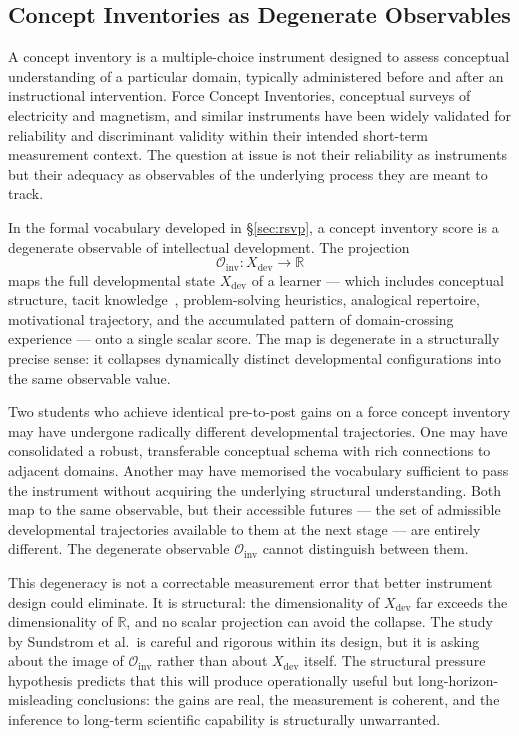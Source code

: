 \documentclass[11pt,a4paper]{article}
\theoremstyle{plain}
\theoremstyle{definition}
\theoremstyle{remark}
\begin{document}
\subsection{Concept Inventories as Degenerate Observables}

A concept inventory is a multiple-choice instrument designed to assess
conceptual understanding of a particular domain, typically administered
before and after an instructional intervention. Force Concept Inventories,
conceptual surveys of electricity and magnetism, and similar instruments have
been widely validated for reliability and discriminant validity within their
intended short-term measurement context. The question at issue is not their
reliability as instruments but their adequacy as observables of the underlying
process they are meant to track.

In the formal vocabulary developed in \S\ref{sec:rsvp}, a concept inventory
score is a degenerate observable of intellectual development. The projection
\[
\mathcal{O}_{\mathrm{inv}}: X_{\mathrm{dev}} \to \mathbb{R}
\]
maps the full developmental state $X_{\mathrm{dev}}$ of a learner --- which
includes conceptual structure, tacit knowledge~\cite{Polanyi1966},
problem-solving heuristics, analogical repertoire, motivational trajectory,
and the accumulated pattern of domain-crossing experience --- onto a single
scalar score. The map is degenerate in a structurally precise sense: it
collapses dynamically distinct developmental configurations into the same
observable value.

Two students who achieve identical pre-to-post gains on a force concept
inventory may have undergone radically different developmental trajectories.
One may have consolidated a robust, transferable conceptual schema with
rich connections to adjacent domains. Another may have memorised the
vocabulary sufficient to pass the instrument without acquiring the underlying
structural understanding. Both map to the same observable, but their
accessible futures --- the set of admissible developmental trajectories
available to them at the next stage --- are entirely different. The degenerate
observable $\mathcal{O}_{\mathrm{inv}}$ cannot distinguish between them.

This degeneracy is not a correctable measurement error that better instrument
design could eliminate. It is structural: the dimensionality of
$X_{\mathrm{dev}}$ far exceeds the dimensionality of $\mathbb{R}$, and no
scalar projection can avoid the collapse. The study by Sundstrom et al.\ is
careful and rigorous within its design, but it is asking about the image of
$\mathcal{O}_{\mathrm{inv}}$ rather than about $X_{\mathrm{dev}}$ itself.
The structural pressure hypothesis predicts that this will produce
operationally useful but long-horizon-misleading conclusions: the gains are
real, the measurement is coherent, and the inference to long-term scientific
capability is structurally unwarranted.
\end{document}
